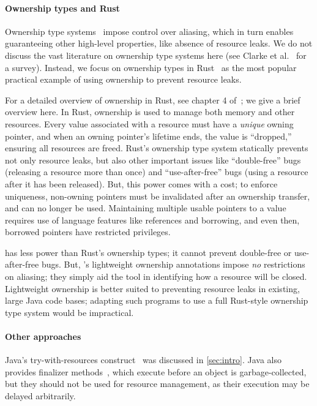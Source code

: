 \paragraph{Ownership types and Rust} Ownership type
systems~\cite{clarke2013ownership} impose control over aliasing, which
in turn enables guaranteeing other high-level properties, like absence of
resource leaks.  We do not discuss the vast literature on ownership type systems
here (see Clarke et al.~\cite{clarke2013ownership} for a survey). Instead, we
focus on ownership types in Rust~\cite{klabnik2018rust} as the most popular
practical example of using ownership to prevent resource leaks.

For a detailed overview of ownership in Rust, see chapter 4
of~\cite{klabnik2018rust}; we give a brief overview here.  In Rust, ownership is
used to manage both memory and other resources.  Every value associated with a
resource must have a \emph{unique} owning pointer, and when an owning pointer's
lifetime ends, the value is ``dropped,'' ensuring all resources are freed.
Rust's ownership type system statically prevents
not only resource leaks, but also other important issues like ``double-free'' bugs
(releasing a resource more than once) and ``use-after-free'' bugs (using a
resource after it has been released). But, this power comes with a cost; to
enforce uniqueness, non-owning pointers must be invalidated after an ownership transfer,
and can no longer be used.  Maintaining multiple
usable pointers to a value requires use of language features like references and
borrowing, and even then, borrowed pointers have restricted privileges.

\Tool has less power than Rust's ownership types; it cannot prevent double-free
or use-after-free bugs.  But,
\Tool's lightweight ownership annotations impose \emph{no} restrictions on
aliasing; they simply aid the tool in identifying how a resource will
be closed.  Lightweight ownership is better suited to preventing
resource leaks in existing, large Java code bases; adapting such programs to use
a full Rust-style ownership type system would be impractical.

\paragraph{Other approaches} Java's try-with-resources
construct~\cite{try-with-resources} was discussed in \cref{sec:intro}.  Java
also provides finalizer methods~\cite[Chapter 12]{gosling2014jls}, which execute before an object is
garbage-collected, but they should not be used for resource management, as their
execution may be delayed arbitrarily.

